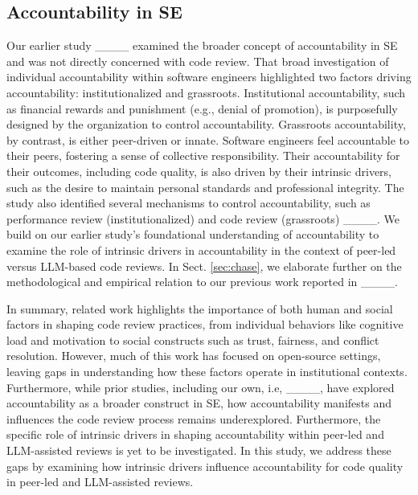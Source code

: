 \subsection{Accountability in SE}

Our earlier study ____ examined the broader concept of accountability in SE and was not directly concerned with code review. That broad investigation of individual accountability within software engineers highlighted two factors driving accountability: institutionalized and grassroots. Institutional accountability, such as financial rewards and punishment (e.g., denial of promotion), is purposefully designed by the organization to control accountability. Grassroots accountability, by contrast, is either peer-driven or innate. Software engineers feel accountable to their peers, fostering a sense of collective responsibility. Their accountability for their outcomes, including code quality, is also driven by their intrinsic drivers, such as the desire to maintain personal standards and professional integrity. The study also identified several mechanisms to control accountability, such as performance review (institutionalized) and code review (grassroots) ____. We build on our earlier study's foundational understanding of accountability to examine the role of intrinsic drivers in accountability in the context of peer-led versus LLM-based code reviews. In Sect. \ref{sec:chase}, we elaborate further on the methodological and empirical relation to our previous work reported in ____.

In summary, related work highlights the importance of both human and social factors in shaping code review practices, from individual behaviors like cognitive load and motivation to social constructs such as trust, fairness, and conflict resolution. However, much of this work has focused on open-source settings, leaving gaps in understanding how these factors operate in institutional contexts. Furthermore, while prior studies, including our own, i.e, ____, have explored accountability as a broader construct in SE, how accountability manifests and influences the code review process remains underexplored. Furthermore, the specific role of intrinsic drivers in shaping accountability within peer-led and LLM-assisted reviews is yet to be investigated. In this study, we address these gaps by examining how intrinsic drivers influence accountability for code quality in peer-led and LLM-assisted reviews.